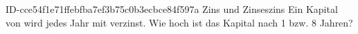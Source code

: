 \begin{exercise}
      {ID-cce54f1e71ffebfba7ef3b75c0b3ecbce84f597a}
      {Zins und Zinseszins}
  \ifproblem\problem
    Ein Kapital von  wird jedes Jahr mit  verzinst. Wie
    hoch ist das Kapital nach \num{1} bzw. \num{8} Jahren?
  \fi
\end{exercise}
